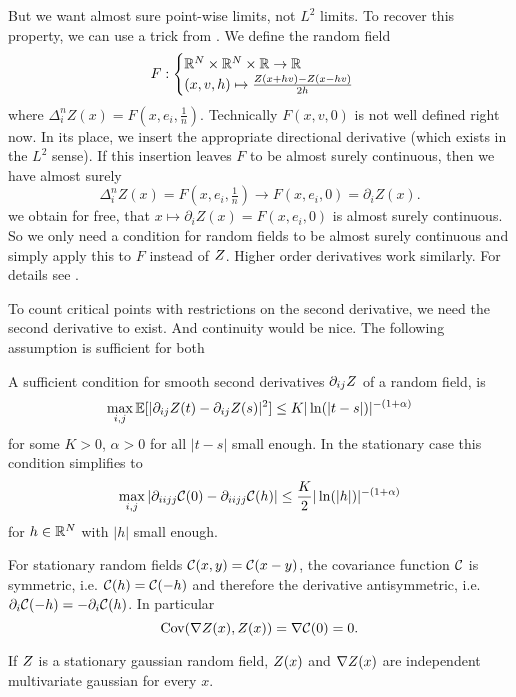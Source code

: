 But we want almost sure point-wise limits, not \(L^2\) limits. To recover this
property, we can use a trick from 
\textcite[Sec.~1.4.2]{adlerRandomFieldsGeometry2007}. We define the random field
\[
	F: \begin{cases}
		\mathbb{R}^N \times \mathbb{R}^N \times \mathbb{R} \to \mathbb{R}\\
		(x,v,h)	\mapsto \frac{Z(x+hv)-Z(x-hv)}{2h}
	\end{cases}
\]
where \(\Delta_i^n Z(x) = F(x,e_i,\tfrac1n)\). Technically \(F(x,v,0)\) is not
well defined right now. In its place, we insert the appropriate directional
derivative (which exists in the \(L^2\) sense). If this insertion leaves \(F\)
to be almost surely continuous, then we have almost surely
\[
	\Delta_i^n Z(x)=F(x,e_i,\tfrac1n)\to F(x, e_i, 0)= \partial_i Z(x).
\]
we obtain for free, that \(x\mapsto \partial_i Z(x) = F(x,e_i,0)\) is almost
surely continuous. So we only need a condition for random fields to be almost
surely continuous and simply apply this to \(F\) instead of \(Z\). Higher
order derivatives work similarly. For details see
\textcite[Sec.~1.4.2]{adlerRandomFieldsGeometry2007}.

To count critical points with restrictions on the second derivative, we need
the second derivative to exist. And continuity would be nice. The following
assumption is sufficient for both \parencite*[cf.
Theorem~1.4.2]{adlerRandomFieldsGeometry2007}

\begin{assumption}\label{assmpt: smoothness assumption}
	A sufficient condition for smooth second derivatives \(\partial_{ij}	Z\)
	of a random field, is
	\begin{equation}\label{eq: sufficient for continuous second derivative}
		\max_{i,j}\mathbb{E}[|\partial_{ij}Z(t) - \partial_{ij}Z(s)|^2]
		\le K |\ln(|t-s|)|^{-(1+\alpha)}
	\end{equation}
	for some \(K>0\), \(\alpha>0\) for all \(|t-s|\) small enough.
	In the stationary case this condition simplifies to
	\[
		\max_{i,j}|\partial_{ii jj}\mathcal{C}(0)
		-\partial_{ii jj}\mathcal{C}(h)| \le \frac{K}2 |\ln(|h|)|^{-(1+\alpha)}
	\]
	for \(h\in\mathbb{R}^N\) with \(|h|\) small enough.
\end{assumption}


\begin{remark}\label{rem: covariance uncorrelated}
	For stationary random fields \(\mathcal{C}(x,y)=\mathcal{C}(x-y)\), the covariance
	function \(\mathcal{C}\) is symmetric, i.e. \(\mathcal{C}(h)=\mathcal{C}(-h)\)
	and therefore the derivative antisymmetric, i.e.
	\(\partial_i\mathcal{C}(-h)=-\partial_i\mathcal{C}(h)\). In particular
	\begin{equation*}
		\operatorname{Cov}(\nabla Z(x), Z(x)) = \nabla \mathcal{C}(0)=0.
	\end{equation*}
\end{remark}
\begin{corollary} \label{cor: uncorr leads to indep in gaussian case}
	If \(Z\) is a stationary gaussian random field, \(Z(x)\) and
	\(\nabla Z(x)\) are independent multivariate gaussian for every \(x\).
\end{corollary}
